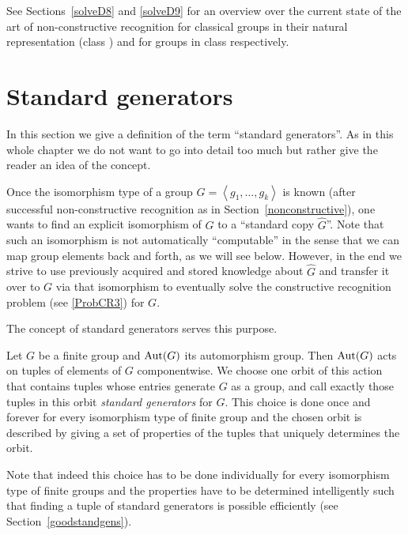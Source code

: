 See Sections~\ref{solveD8} and \ref{solveD9} for an overview over the
current state of the art of non-constructive recognition for classical
groups in their natural representation (class ) and for groups in class 
respectively.

\section{Standard generators}
\label{standardgens}

In this section we give a definition of the term
``standard generators''. As in this whole chapter we do not want to go
into detail too much but rather give the reader an idea of the
concept.

Once the isomorphism type of a group $G = \left< g_1, \ldots,
g_k\right>$ is known (after successful non-con\-struc\-tive recognition as in
Section~\ref{nonconstructive}), one wants to find an explicit
isomorphism of $G$ to a ``standard copy $\hat G$''. Note that such an
isomorphism is not automatically ``computable'' in the sense that 
we can map group elements back and forth, as we will see below.
However, in the end we strive to use previously acquired and stored
knowledge about $\hat G$ and transfer it over to $G$ via that
isomorphism to eventually solve the constructive recognition problem (see
\ref{ProbCR3}) for $G$.

The concept of standard generators serves this purpose.

\begin{Def}
    Let $G$ be a finite group and $\Aut(G)$ its automorphism group. Then
    $\Aut(G)$ acts on tuples of elements of $G$ componentwise. We choose
    one orbit of this action that contains tuples whose entries
    generate $G$ as a group, and call exactly those tuples in this
    orbit \emph{standard generators} for $G$. This choice is done once
    and forever for every isomorphism type of finite group and the
    chosen orbit is described by giving a set of properties of the
    tuples that uniquely determines the orbit.
\end{Def}

\begin{Rem}
Note that indeed this choice has to be done individually for every
isomorphism type of finite groups and the properties have to be
determined intelligently such that finding a tuple of standard
generators is possible efficiently (see Section~\ref{goodstandgens}).
\end{Rem}

